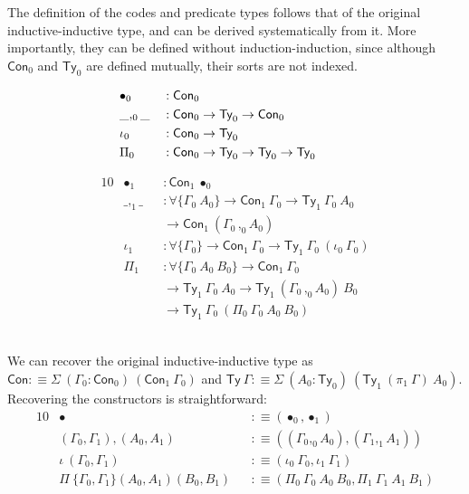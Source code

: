 \documentclass[autoref]{llncs}
\newcommand{\GG}{\Gamma}
\begin{document}
The definition of the codes and predicate types follows that of the original
inductive-inductive type, and can be derived systematically from it. More
importantly, they can be defined without induction-induction, since although
$\textsf{Con}_0$ and $\textsf{Ty}_0$ are defined mutually, their sorts are not
indexed. \\
\vspace{-0.2em}
\begin{minipage}{0.4\textwidth}
\begin{alignat*}{10}
  & \bullet_0 && : \textsf{Con}_0 \\
  & \_,_0\_ && : \textsf{Con}_0 \to \textsf{Ty}_0 \to \textsf{Con}_0 \\
  & \iota_0 && : \textsf{Con}_0 \to \textsf{Ty}_0 \\
  & \Pi_0 && : \textsf{Con}_0 \to \textsf{Ty}_0 \to \textsf{Ty}_0 \to \textsf{Ty}_0 \hspace{2.8em} \\
\end{alignat*}
\end{minipage}
\begin{minipage}{0.5\textwidth}
\vspace{-1.3em}
\begin{alignat*}{10}
  & \bullet_1 && : \textsf{Con}_1\ \bullet_0 \\
  & \_,_1\_ && : \forall\{\GG_0\ A_0\} \to \textsf{Con}_1\ \GG_0 \to \textsf{Ty}_1\ \GG_0\ A_0 \\
  & && \to \textsf{Con}_1\ (\GG_0 \,,_0 A_0) \\
  & \iota_1 && : \forall\{\GG_0\} \to \textsf{Con}_1\ \GG_0 \to \textsf{Ty}_1\ \GG_0\ (\iota_0\ \GG_0) \\
  & \Pi_1 && : \forall\{\GG_0\ A_0\ B_0\} \to \textsf{Con}_1\ \GG_0 \\
  & && \to \textsf{Ty}_1\ \GG_0\ A_0 \to \textsf{Ty}_1\ (\GG_0\, ,_0 A_0)\ B_0 \\
  & && \to \textsf{Ty}_1\ \GG_0\ (\Pi_0\ \GG_0\ A_0\ B_0)
\end{alignat*}
\end{minipage}
\\

We can recover the original inductive-inductive type as $\textsf{Con} :\equiv
\Sigma\ (\GG_0 : \textsf{Con}_0)\ (\textsf{Con}_1\ \GG_0)$ and $\textsf{Ty}\ \GG
:\equiv \Sigma\ (A_0 :
\textsf{Ty}_0)\ (\textsf{Ty}_1\ (\pi_1\ \GG)\ A_0)$. Recovering the constructors
is straightforward:
\vspace{-0.2em}
\begin{alignat*}{10}
  & \bullet && :\equiv (\bullet_0 , \bullet_1) \\
  & (\GG_0 , \GG_1) , (A_0 , A_1) && :\equiv ((\GG_0 \mathbin{,_0} A_0) , (\GG_1 ,_1 A_1)) \\
  & \iota\ (\GG_0 , \GG_1) && :\equiv (\iota_0\ \GG_0 , \iota_1\ \GG_1) \\
  & \Pi\ \{\GG_0 , \GG_1\}(A_0 , A_1) (B_0 , B_1) && :\equiv
    (\Pi_0\ \GG_0\ A_0\ B_0 , \Pi_1\ \GG_1\ A_1\ B_1)
\end{alignat*}
\end{document}
